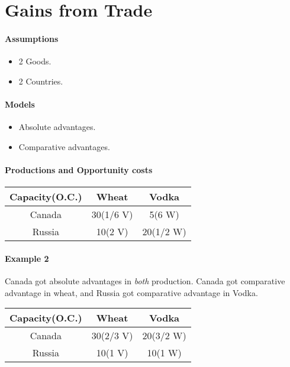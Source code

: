 \documentclass{article}
\begin{document}
	\section{Gains from Trade}
	\paragraph{Assumptions}
	\begin{itemize}
		\item 2 Goods.
		\item 2 Countries.
	\end{itemize}
	\paragraph{Models}
	\begin{itemize}
		\item Absolute advantages.
		\item Comparative advantages.
	\end{itemize}
	\paragraph{Productions and Opportunity costs}
	\begin{center}
		\begin{tabular}{|c|c|c|}
			\hline
			Capacity(O.C.) & Wheat & Vodka \\ \hline
			Canada & 30(1/6 V) & 5(6 W) \\ \hline
			Russia & 10(2 V) & 20(1/2 W) \\
			\hline
		\end{tabular}
	\end{center}
	\paragraph{Example 2}
	\quad \newline Canada got absolute advantages in \emph{both} production.
	\newline Canada got comparative advantage in wheat, and Russia got comparative advantage in Vodka.
	\begin{center}
		\begin{tabular}{|c|c|c|}
		\hline
			Capacity(O.C.)& Wheat & Vodka \\ \hline
			Canada & 30(2/3 V) & 20(3/2 W) \\ \hline
			Russia & 10(1 V) & 10(1 W) \\ \hline
		\end{tabular}

	\end{center}
\end{document}
